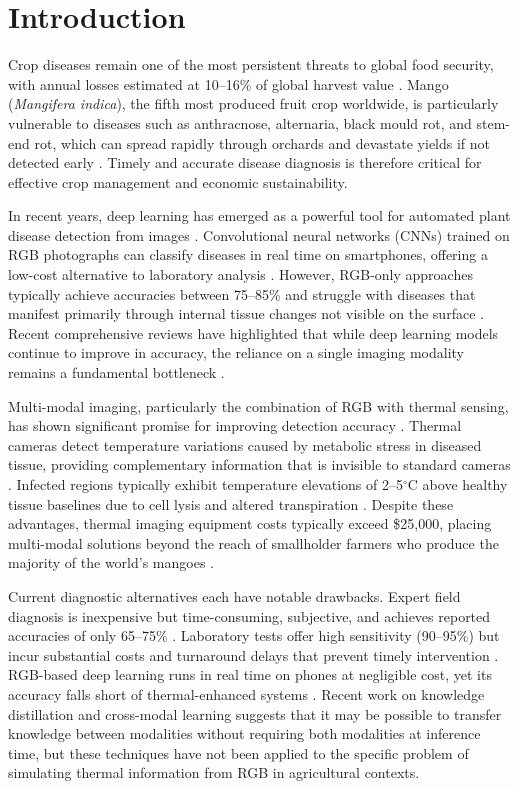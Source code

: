 \documentclass[utf8]{FrontiersinHarvard} %
\begin{document}
\section{Introduction}
Crop diseases remain one of the most persistent threats to global food security, with annual losses estimated at 10--16\% of global harvest value \cite{fao2021,fao2023,savary2019}. Mango (\textit{Mangifera indica}), the fifth most produced fruit crop worldwide, is particularly vulnerable to diseases such as anthracnose, alternaria, black mould rot, and stem-end rot, which can spread rapidly through orchards and devastate yields if not detected early \cite{singh2019}. Timely and accurate disease diagnosis is therefore critical for effective crop management and economic sustainability.

In recent years, deep learning has emerged as a powerful tool for automated plant disease detection from images \cite{mohanty2016,ferentinos2018,thakur2022}. Convolutional neural networks (CNNs) trained on RGB photographs can classify diseases in real time on smartphones, offering a low-cost alternative to laboratory analysis \cite{kamilaris2018,coulibaly2022}. However, RGB-only approaches typically achieve accuracies between 75--85\% and struggle with diseases that manifest primarily through internal tissue changes not visible on the surface \cite{pineda2021,abade2021}. Recent comprehensive reviews have highlighted that while deep learning models continue to improve in accuracy, the reliance on a single imaging modality remains a fundamental bottleneck \cite{thakur2022,hasan2024}.

Multi-modal imaging, particularly the combination of RGB with thermal sensing, has shown significant promise for improving detection accuracy \cite{khanal2017,maimaitijiang2020}. Thermal cameras detect temperature variations caused by metabolic stress in diseased tissue, providing complementary information that is invisible to standard cameras \cite{mahlein2016,pineda2021}. Infected regions typically exhibit temperature elevations of 2--5$^{\circ}$C above healthy tissue baselines due to cell lysis and altered transpiration \cite{mahlein2016}. Despite these advantages, thermal imaging equipment costs typically exceed \$25,000, placing multi-modal solutions beyond the reach of smallholder farmers who produce the majority of the world's mangoes \cite{sishodia2020}.

Current diagnostic alternatives each have notable drawbacks. Expert field diagnosis is inexpensive but time-consuming, subjective, and achieves reported accuracies of only 65--75\% \cite{ferentinos2018}. Laboratory tests offer high sensitivity (90--95\%) but incur substantial costs and turnaround delays that prevent timely intervention \cite{martinelli2015}. RGB-based deep learning runs in real time on phones at negligible cost, yet its accuracy falls short of thermal-enhanced systems \cite{mohanty2016,hasan2024}. Recent work on knowledge distillation \cite{hinton2015,li2023_kd} and cross-modal learning \cite{xu2023} suggests that it may be possible to transfer knowledge between modalities without requiring both modalities at inference time, but these techniques have not been applied to the specific problem of simulating thermal information from RGB in agricultural contexts.
\end{document}
